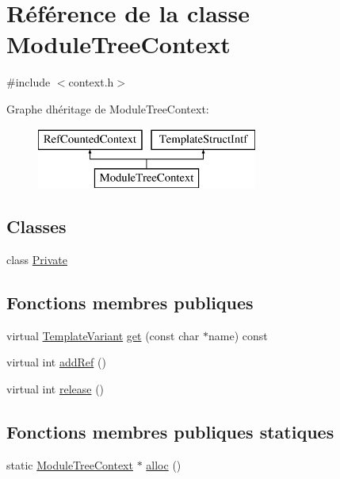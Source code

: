 \hypertarget{class_module_tree_context}{}\section{Référence de la classe Module\+Tree\+Context}
\label{class_module_tree_context}


{\ttfamily \#include $<$context.\+h$>$}

Graphe d\textquotesingle{}héritage de Module\+Tree\+Context\+:\begin{figure}[H]
\begin{center}
\leavevmode
\includegraphics[height=2.000000cm]{class_module_tree_context}
\end{center}
\end{figure}
\subsection*{Classes}
\begin{DoxyCompactItemize}
\item 
class \hyperlink{class_module_tree_context_1_1_private}{Private}
\end{DoxyCompactItemize}
\subsection*{Fonctions membres publiques}
\begin{DoxyCompactItemize}
\item 
virtual \hyperlink{class_template_variant}{Template\+Variant} \hyperlink{class_module_tree_context_aab8a3e001c57fb0523806275371da017}{get} (const char $\ast$name) const 
\item 
virtual int \hyperlink{class_module_tree_context_a4aa904edd0388660d04d1b96f6b37aed}{add\+Ref} ()
\item 
virtual int \hyperlink{class_module_tree_context_a3e9934215083fbf3ae3cb5c65ecad344}{release} ()
\end{DoxyCompactItemize}
\subsection*{Fonctions membres publiques statiques}
\begin{DoxyCompactItemize}
\item 
static \hyperlink{class_module_tree_context}{Module\+Tree\+Context} $\ast$ \hyperlink{class_module_tree_context_a2fe6c39e80b2e492444ae8a45c840042}{alloc} ()
\end{DoxyCompactItemize}


